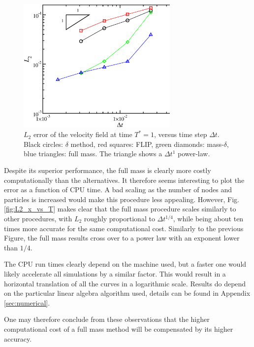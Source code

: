 \documentclass{ws-ijcm}
\begin{document}

\begin{figure}
  \centering 
  \includegraphics[width=0.7\textwidth]{L2_x}
  \caption{%
    $L_2$ error of the velocity  field at
    time $T^*=1$, versus time step $\Delta t$.  Black circles: $\delta$
    method, red squares: FLIP, green diamonds: mass-$\delta$, blue triangles:
    full mass. The triangle shows a $\Delta t^1$ power-law.
    \label{fig:L2_x}
  }
\end{figure}

Despite its superior performance, the full mass is clearly more
costly computationally than the alternatives. It therefore seems
interesting to plot the error as a function of CPU time.
A bad scaling as the number of nodes and particles is increased
would make this procedure less appealing. However,
Fig. \ref{fig:L2_x_vs_T} makes clear that the full mass
procedure scales similarly to other procedures, with $L_2$ roughly
proportional to $\Delta t^{1/4}$, while being about ten times
more accurate for the same computational cost. Similarly
to the previous Figure, the full mass results cross over to a power
law with an exponent lower than $1/4$.

The CPU run times clearly depend on the machine used, but a faster one
would likely accelerate all simulations by a similar factor. This
would result in a horizontal translation of all the curves in a
logarithmic scale. Results do depend on the particular linear algebra
algorithm used, details can be found in Appendix \ref{sec:numerical}.

One may therefore conclude from these observations that the higher
computational cost of a full mass method will be compensated by its
higher accuracy.
\end{document}
